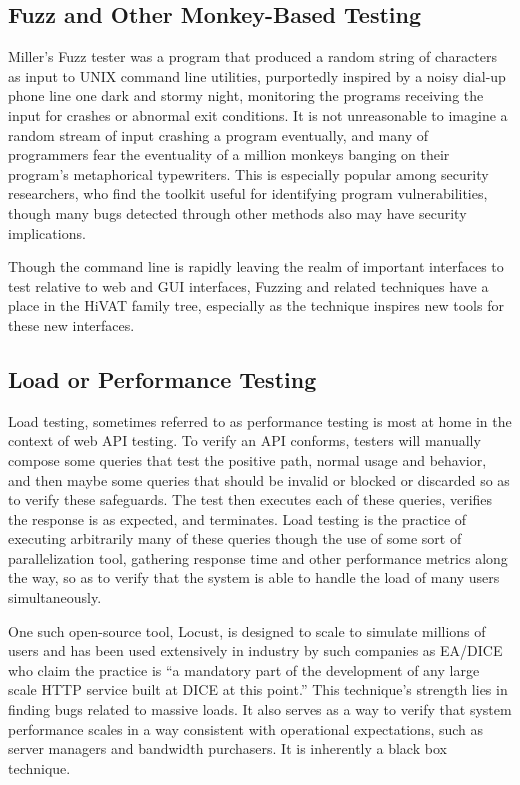 \subsection{Fuzz and Other Monkey-Based Testing}
 Miller's Fuzz tester was a program that produced a random string of characters as input to UNIX command line utilities, purportedly inspired by a noisy dial-up phone line one dark and stormy night, monitoring the programs receiving the input for crashes or abnormal exit conditions. It is not unreasonable to imagine a random stream of input crashing a program eventually, and many of programmers fear the eventuality of a million monkeys banging on their program's metaphorical typewriters. This is especially popular among security researchers, who find the toolkit useful for identifying program vulnerabilities, though many bugs detected through other methods also may have security implications.

 Though the command line is rapidly leaving the realm of important interfaces to test relative to web and GUI interfaces, Fuzzing and related techniques have a place in the HiVAT family tree, especially as the technique inspires new tools for these new interfaces.

\subsection{Load or Performance Testing}
Load testing, sometimes referred to as performance testing is most at home in the context of web API testing. To verify an API conforms, testers will manually compose some queries that test the positive path, normal usage and behavior, and then maybe some queries that should be invalid or blocked or discarded so as to verify these safeguards. The test then executes each of these queries, verifies the response is as expected, and terminates. Load testing is the practice of executing arbitrarily many of these queries though the use of some sort of parallelization tool, gathering response time and other performance metrics along the way, so as to verify that the system is able to handle the load of many users simultaneously.

One such open-source tool, Locust\citep{heymanlocust}, is designed to scale to simulate millions of users and has been used extensively in industry by such companies as EA/DICE who claim the practice is ``a mandatory part of the development of any large scale HTTP service built at DICE at this point.'' This technique's strength lies in finding bugs related to massive loads. It also serves as a way to verify that system performance scales in a way consistent with operational expectations, such as server managers and bandwidth purchasers. It is inherently a black box technique.

